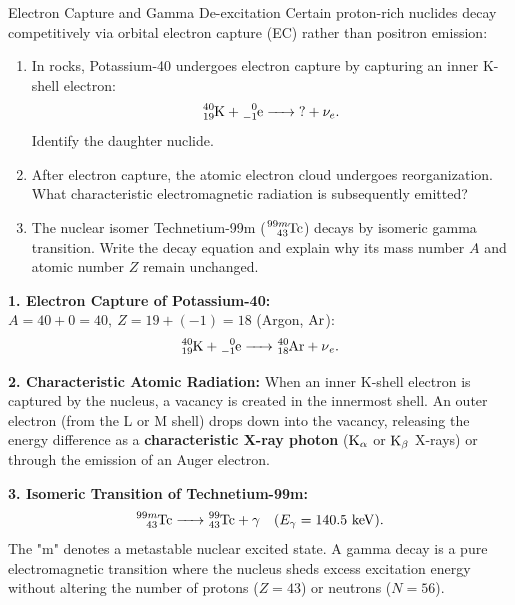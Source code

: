 \begin{exercise}{Electron Capture and Gamma De-excitation}
Certain proton-rich nuclides decay competitively via orbital electron capture (EC) rather than positron emission:
\begin{enumerate}[leftmargin=1.5em,itemsep=2pt]
  \item In rocks, Potassium-40 undergoes electron capture by capturing an inner K-shell electron:
  \[
  \ce{^{40}_{19}K + ^{0}_{-1}e ->} \mathbf{?} + \nu_e.
  \]
  Identify the daughter nuclide.
  \item After electron capture, the atomic electron cloud undergoes reorganization. What characteristic electromagnetic radiation is subsequently emitted?
  \item The nuclear isomer Technetium-99m ($\ce{^{99m}_{43}Tc}$) decays by isomeric gamma transition. Write the decay equation and explain why its mass number $A$ and atomic number $Z$ remain unchanged.
\end{enumerate}
\end{exercise}

\begin{tabletworkspace}[5.0cm]
\end{tabletworkspace}

\begin{solution}
\textbf{1. Electron Capture of Potassium-40:}
$A = 40 + 0 = 40,\ Z = 19 + (-1) = 18$ (Argon, $\ce{Ar}$):
\[
\ce{^{40}_{19}K + ^{0}_{-1}e -> ^{40}_{18}Ar + \nu_e}.
\]

\textbf{2. Characteristic Atomic Radiation:}
When an inner K-shell electron is captured by the nucleus, a vacancy is created in the innermost shell. An outer electron (from the L or M shell) drops down into the vacancy, releasing the energy difference as a \textbf{characteristic X-ray photon} ($\ce{K_\alpha}$ or $\ce{K_\beta}$ X-rays) or through the emission of an Auger electron.

\textbf{3. Isomeric Transition of Technetium-99m:}
\[
\ce{^{99m}_{43}Tc -> ^{99}_{43}Tc + \gamma} \quad (E_\gamma = 140.5\ \mathrm{keV}).
\]
The "m" denotes a metastable nuclear excited state. A gamma decay is a pure electromagnetic transition where the nucleus sheds excess excitation energy without altering the number of protons ($Z=43$) or neutrons ($N=56$).
\end{solution}

